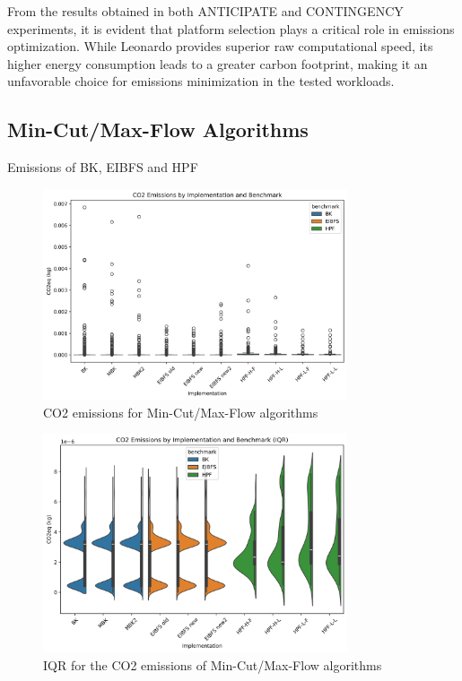 \documentclass[a4paper,singleside,12pt]{report} %
\begin{document}
From the results obtained in both ANTICIPATE and CONTINGENCY experiments, it is evident that platform selection plays a critical role in emissions optimization. While Leonardo provides 
superior raw computational speed, its higher energy consumption leads to a greater carbon footprint, making it an unfavorable choice for emissions minimization in the tested workloads.

\subsection{Min-Cut/Max-Flow Algorithms}

Emissions of BK, EIBFS and HPF

\begin{figure}[h!]
    \centering
    \includegraphics[width=0.8\textwidth]{imgs/max_flow_emissions.png}
    \caption{CO2 emissions for Min-Cut/Max-Flow algorithms}
    \label{fig:max_flow_emissions}
\end{figure}

\begin{figure}[h!]
    \centering
    \includegraphics[width=0.8\textwidth]{imgs/max_flow_emissions_iqr.png}
    \caption{IQR for the CO2 emissions of Min-Cut/Max-Flow algorithms}
    \label{fig:max_flow_emissions_iqr}
\end{figure}
\end{document}
